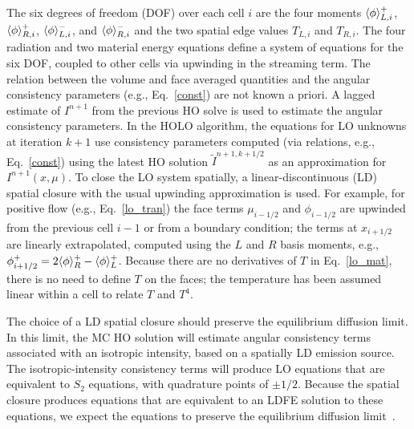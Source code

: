 The six degrees of freedom (DOF) over each cell $i$ are the four moments $\langle \phi \rangle_{L,i}^+$,
$\langle \phi \rangle_{R,i}^+$, $\langle \phi \rangle_{L,i}^-$, and $\langle \phi \rangle_{R,i}^-$ and the two
spatial edge values $T_{L,i}$ and $T_{R,i}$. The four radiation and two material
energy equations define a system of equations for the six DOF, coupled to other cells
via upwinding in the streaming term.
The relation between the volume and face averaged quantities and the angular consistency parameters (e.g., Eq.~\eqref{const}) are not known a priori. 
A lagged estimate of $I^{n+1}$ from the previous HO solve is
used to estimate the angular consistency parameters. In the HOLO algorithm, the equations for LO unknowns at iteration $k+1$ use consistency parameters
computed (via relations, e.g., Eq.~\eqref{const}) using the latest HO solution $\tilde{I}^{n+1,k+1/2}$
as an approximation for $I^{n+1}(x,\mu)$. To close the LO system spatially, a linear-discontinuous (LD) spatial closure with the usual upwinding
approximation is used.  For example, for positive flow (e.g., Eq.~\eqref{lo_tran}) the face terms $\mu_{i-1/2}$ and $\phi_{i-1/2}$
are upwinded from the previous cell $i-1$ or from a boundary condition; the terms
at $x_{i+1/2}$ are linearly extrapolated, computed using the $L$ and $R$ basis
moments, e.g., $\phi^+_{i+1/2} = 2\langle \phi \rangle_R^+ - \langle \phi \rangle_L^+$. 
Because there are no derivatives of $T$ in Eq.~\eqref{lo_mat}, there is no need
to define $T$ on the faces; the temperature has been assumed linear within a cell to
relate $T$ and $T^4$.  

The choice of a LD spatial closure should preserve the equilibrium diffusion limit.  In this limit, the MC HO solution will estimate angular consistency terms 
associated with an isotropic intensity, based on a spatially LD emission source.  The isotropic-intensity consistency terms will produce
LO equations that are equivalent to $S_2$ equations, with quadrature points of $\pm 1/2$.  Because the spatial
closure produces equations that are equivalent to an LDFE solution to these equations, we expect the equations to preserve the
equilibrium diffusion limit~\cite{morel_newton,densmore_edl}.

